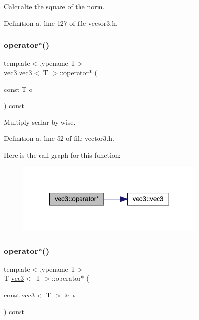 Calcualte the square of the norm. 



Definition at line 127 of file vector3.\+h.

\mbox{\label{structvec3_a769b2eeb0c298c38d62cf06ea50534d7}} 
\subsubsection{\texorpdfstring{operator$\ast$()}{operator*()}\hspace{0.1cm}{\footnotesize\ttfamily [1/2]}}
{\footnotesize\ttfamily template$<$typename T$>$ \\
\mbox{\hyperlink{structvec3}{vec3}} \mbox{\hyperlink{structvec3}{vec3}}$<$ T $>$\+::operator$\ast$ (\begin{DoxyParamCaption}\item[{const T}]{c }\end{DoxyParamCaption}) const\hspace{0.3cm}{\ttfamily [inline]}}



Multiply scalar by wise. 



Definition at line 52 of file vector3.\+h.

Here is the call graph for this function\+:\nopagebreak
\begin{figure}[H]
\begin{center}
\leavevmode
\includegraphics[width=264pt]{structvec3_a769b2eeb0c298c38d62cf06ea50534d7_cgraph}
\end{center}
\end{figure}
\mbox{\label{structvec3_a339b8432cc6f88eb9da83c6075f1f5af}} 
\subsubsection{\texorpdfstring{operator$\ast$()}{operator*()}\hspace{0.1cm}{\footnotesize\ttfamily [2/2]}}
{\footnotesize\ttfamily template$<$typename T$>$ \\
T \mbox{\hyperlink{structvec3}{vec3}}$<$ T $>$\+::operator$\ast$ (\begin{DoxyParamCaption}\item[{const \mbox{\hyperlink{structvec3}{vec3}}$<$ T $>$ \&}]{v }\end{DoxyParamCaption}) const\hspace{0.3cm}{\ttfamily [inline]}}



